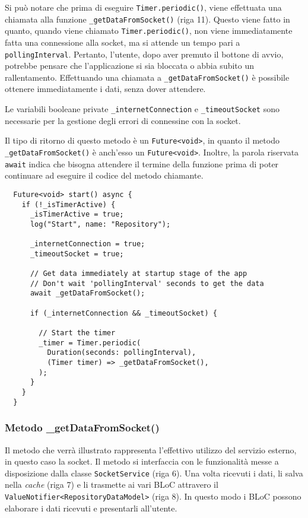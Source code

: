 Si può notare che prima di eseguire \verb|Timer.periodic()|, viene effettuata una chiamata alla funzione \verb|_getDataFromSocket()| (riga 11). Questo viene fatto in quanto, quando viene chiamato \verb|Timer.periodic()|, non viene immediatamente fatta una connessione alla socket, ma si attende un tempo pari a \verb|pollingInterval|. Pertanto, l'utente, dopo aver premuto il bottone di avvio, potrebbe pensare che l'applicazione si sia bloccata o abbia subito un rallentamento. Effettuando una chiamata a \verb|_getDataFromSocket()| è possibile ottenere immediatamente i dati, senza dover attendere.

Le variabili booleane private \verb|_internetConnection| e \verb|_timeoutSocket| sono necessarie per la gestione degli errori di connessine con la socket.

Il tipo di ritorno di questo metodo è un \verb|Future<void>|, in quanto il metodo \verb|_getDataFromSocket()| è anch'esso un \verb|Future<void>|. Inoltre, la parola riservata \verb|await| indica che bisogna attendere il termine della funzione prima di poter continuare ad eseguire il codice del metodo chiamante.
  \begin{lstlisting}
  Future<void> start() async {
    if (!_isTimerActive) {
      _isTimerActive = true;
      log("Start", name: "Repository");

      _internetConnection = true;
      _timeoutSocket = true;

      // Get data immediately at startup stage of the app
      // Don't wait 'pollingInterval' seconds to get the data
      await _getDataFromSocket();

      if (_internetConnection && _timeoutSocket) {
        
        // Start the timer
        _timer = Timer.periodic(
          Duration(seconds: pollingInterval),
          (Timer timer) => _getDataFromSocket(),
        );
      }
    }
  }
  \end{lstlisting}

\subsubsection{Metodo \_getDataFromSocket()}
Il metodo che verrà illustrato rappresenta l'effettivo utilizzo del servizio esterno, in questo caso la socket. Il metodo si interfaccia con le funzionalità messe a disposizione dalla classe \verb|SocketService| (riga 6). Una volta ricevuti i dati, li salva nella \textit{cache} (riga 7) e li trasmette ai vari BLoC attravero il \verb|ValueNotifier<RepositoryDataModel>| (riga 8). In questo modo i BLoC possono elaborare i dati ricevuti e presentarli all'utente.

